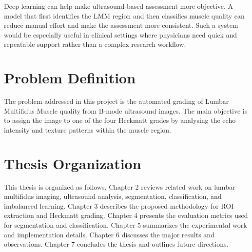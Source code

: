 Deep learning can help make ultrasound-based assessment more objective. A model that first identifies the LMM region and then classifies muscle quality can reduce manual effort and make the assessment more consistent. Such a system would be especially useful in clinical settings where physicians need quick and repeatable support rather than a complex research workflow.

\section{Problem Definition}
\label{problem}
The problem addressed in this project is the automated grading of Lumbar Multifidus Muscle quality from B-mode ultrasound images. The main objective is to assign the image to one of the four Heckmatt grades by analysing the echo intensity and texture patterns within the muscle region.

\section{Thesis Organization}
This thesis is organized as follows. Chapter 2 reviews related work on lumbar multifidus imaging, ultrasound analysis, segmentation, classification, and imbalanced learning. Chapter 3 describes the proposed methodology for ROI extraction and Heckmatt grading. Chapter 4 presents the evaluation metrics used for segmentation and classification. Chapter 5 summarizes the experimental work and implementation details. Chapter 6 discusses the major results and observations. Chapter 7 concludes the thesis and outlines future directions.
